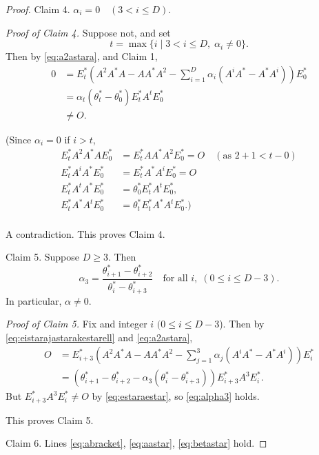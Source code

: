 \documentclass[
]{book}
\theoremstyle{definition}
\theoremstyle{definition}
\theoremstyle{definition}
\theoremstyle{definition}
\theoremstyle{remark}
\begin{document}
\begin{proof}
Claim 4. \(\alpha_i = 0 \quad (3<i\leq D)\).

\emph{Proof of Claim 4.}
Suppose not, and set
\[t = \max\{i\mid 3<i\leq D, \; \alpha_i\neq 0\}.\]
Then by \eqref{eq:a2astara}, and Claim 1,
\begin{align}
0 & = E^*_t\left(A^2A^*A - AA^*A^2 - \sum_{i=1}^D\alpha_i(A^iA^*-A^*A^i)\right)E^*_0\\
& = \alpha_t(\theta^*_t-\theta^*_0)E^*_tA^tE^*_0\\
& \neq O.
\end{align}

(Since \(\alpha_i=0\) if \(i>t\),
\begin{align}
E^*_tA^2A^*AE^*_0 & = E^*_tAA^*A^2E^*_0 = O \quad (\text{as } 2+1 < t-0)\\
E^*_tA^iA^*E^*_0 & = E^*_tA^*A^iE^*_0 = O\\
E^*_tA^tA^*E^*_0 & = \theta^*_0 E^*_tA^tE^*_0,\\
E^*_tA^*A^tE^*_0 & = \theta^*_tE^*_tA^*A^tE^*_0.)\\
\end{align}

A contradiction. This proves Claim 4.

Claim 5. Suppose \(D\geq 3\). Then
\begin{equation}
\alpha_3 = \frac{\theta^*_{i+1}-\theta^*_{i+2}}{\theta^*_i - \theta^*_{i+3}} \quad \text{for all }i, \; (0\leq i\leq D-3). \label{eq:alpha3}
\end{equation}
In particular, \(\alpha\neq 0\).

\emph{Proof of Claim 5.}
Fix and integer \(i\) \((0\leq i\leq D-3\)). Then
by \eqref{eq:eistarajastarakestarell} and \eqref{eq:a2astara},
\begin{align}
O & = E^*_{i+3}\left(A^2A^*A - AA^*A^2 - \sum_{j=1}^3\alpha_j(A^iA^*-A^*A^i)\right)E^*_i\\
& = (\theta^*_{i+1}-\theta^*_{i+2}-\alpha_3(\theta^*_i-\theta^*_{i+3}))E^*_{i+3}A^3E^*_i.
\end{align}
But \(E^*_{i+3}A^3E^*_i\neq O\) by \eqref{eq:estaraestar}, so \eqref{eq:alpha3} holds.

This proves Claim 5.

Claim 6. Lines \eqref{eq:abracket}, \eqref{eq:aastar}, \eqref{eq:betastar} hold.


\end{proof}
\end{document}
